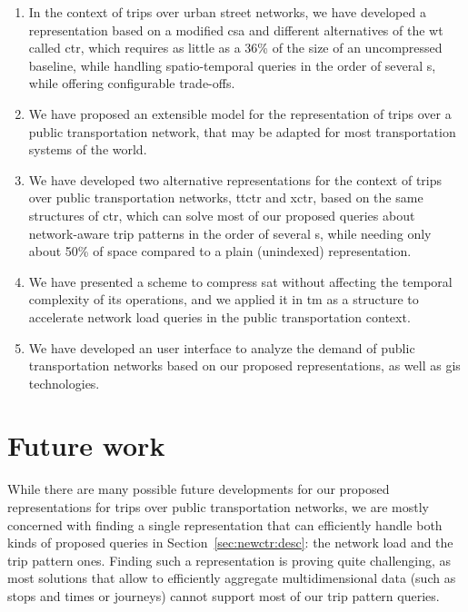 \documentclass[a4paper,10pt,twoside]{book}
\begin{document}
	\begin{enumerate}
	    \item In the context of trips over urban street networks, we have developed a representation based on a modified \gls{csa} and different alternatives of the \gls{wt} called \gls{ctr}, which requires as little as a 36\% of the size of an uncompressed baseline, while handling spatio-temporal queries in the order of several \micro s, while offering configurable trade-offs.
	    
	    \item We have proposed an extensible model for the representation of trips over a public transportation network, that may be adapted for most transportation systems of the world.
	    
	    \item We have developed two alternative representations for the context of trips over public transportation networks, \gls{ttctr} and \gls{xctr}, based on the same structures of \gls{ctr}, which can solve most of our proposed queries about network-aware trip patterns in the order of several \micro s, while needing only about 50\% of space compared to a plain (unindexed) representation.
	    
	    \item We have presented a scheme to compress \gls{sat} without affecting the temporal complexity of its operations, and we applied it in \gls{tm} as a structure to accelerate network load queries in the public transportation context.
	    
	    \item We have developed an user interface to analyze the demand of public transportation networks based on our proposed representations, as well as \gls{gis} technologies. 
	\end{enumerate}
	
	\section{Future work}
	While there are many possible future developments for our proposed representations for trips over public transportation networks, we are mostly concerned with finding a single representation that can efficiently handle both kinds of proposed queries in Section~\ref{sec:newctr:desc}: the network load and the trip pattern ones. Finding such a representation is proving quite challenging, as most solutions that allow to efficiently aggregate multidimensional data (such as stops and times or journeys) cannot support most of our trip pattern queries.
	
\end{document}
